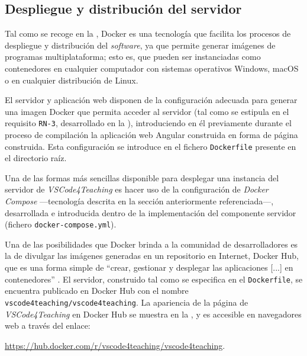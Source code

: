 
\subsection{Despliegue y distribución del servidor}
Tal como se recoge en la , Docker es una tecnología que facilita los procesos de despliegue y distribución del \textit{software}, ya que permite generar imágenes de programas multiplataforma; esto es, que pueden ser instanciadas como contenedores en cualquier computador con sistemas operativos Windows, macOS o en cualquier distribución de Linux.

El servidor y aplicación web disponen de la configuración adecuada para generar una imagen Docker que permita acceder al servidor (tal como se estipula en el requisito \texttt{RN-3}, desarrollado en la ), introduciendo en él previamente durante el proceso de compilación la aplicación web Angular construida en forma de página construida. Esta configuración se introduce en el fichero \texttt{Dockerfile} presente en el directorio raíz.

Una de las formas más sencillas disponible para desplegar una instancia del servidor de \textit{VSCode4Teaching} es hacer uso de la configuración de \textit{Docker Compose} ---tecnología descrita en la sección anteriormente referenciada---, desarrollada e introducida dentro de la implementación del componente servidor (fichero \texttt{docker-compose.yml}).

Una de las posibilidades que Docker brinda a la comunidad de desarrolladores es la de divulgar las imágenes generadas en un repositorio en Internet, Docker Hub, que es una forma simple de ``crear, gestionar y desplegar las aplicaciones [...] en contenedores'' \cite{Deploy_DockerHub}. El servidor, construido tal como se especifica en el \texttt{Dockerfile}, se encuentra publicado en Docker Hub con el nombre \texttt{vscode4teaching/vscode4teaching}. La apariencia de la página de \textit{VSCode4Teaching} en Docker Hub se muestra en la , y es accesible en navegadores web a través del enlace:
\vspace{-0.5\baselineskip}
\begin{center}
    \href{https://hub.docker.com/r/vscode4teaching/vscode4teaching}{https://hub.docker.com/r/vscode4teaching/vscode4teaching}.
\end{center}
\vspace{-0.5\baselineskip}

